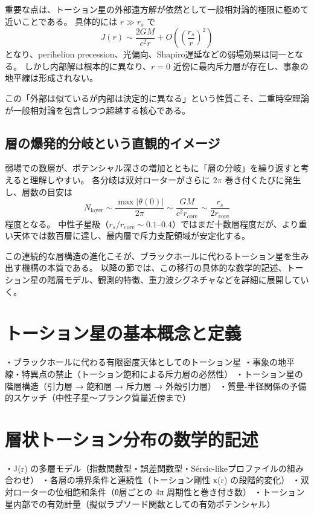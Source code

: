 \documentclass[dvipdfmx,a4paper]{jsbook}
\theoremstyle{definition}
\theoremstyle{remark}
\begin{document}
重要な点は、トーション星の外部遠方解が依然として一般相対論的極限に極めて近いことである。
具体的には $r \gg r_s$ で
\[
J(r) \sim \frac{2GM}{c^2 r} + O\!\left(\left(\frac{r_s}{r}\right)^2\right)
\]
となり、perihelion precession、光偏向、Shapiro遅延などの弱場効果は同一となる。
しかし内部解は根本的に異なり、$r=0$ 近傍に最内斥力層が存在し、事象の地平線は形成されない。

この「外部は似ているが内部は決定的に異なる」という性質こそ、二重時空理論が一般相対論を包含しつつ超越する核心である。

\subsection{層の爆発的分岐という直観的イメージ}

弱場での数層が、ポテンシャル深さの増加とともに「層の分岐」を繰り返すと考えると理解しやすい。
各分岐は双対ローターがさらに $2\pi$ 巻き付くたびに発生し、層数の目安は
\[
N_\text{layer} \sim \frac{\max |\theta(0)|}{2\pi} \sim \frac{GM}{c^2 r_\text{core}} \sim \frac{r_s}{2 r_\text{core}}
\]
程度となる。
中性子星級（$r_s / r_\text{core} \sim 0.1$--$0.4$）ではまだ十数層程度だが、より重い天体では数百層に達し、最内層で斥力支配領域が安定化する。

この連続的な層構造の進化こそが、ブラックホールに代わるトーション星を生み出す機構の本質である。
以降の節では、この移行の具体的な数学的記述、トーション星の階層モデル、観測的特徴、重力波シグネチャなどを詳細に展開していく。

\section{トーション星の基本概念と定義}
    ・ブラックホールに代わる有限密度天体としてのトーション星
    ・事象の地平線・特異点の禁止（トーション飽和による斥力層の必然性）
    ・トーション星の階層構造（引力層 → 飽和層 → 斥力層 → 外殻引力層）
    ・質量-半径関係の予備的スケッチ（中性子星～プランク質量近傍まで）

\section{層状トーション分布の数学的記述}
    ・J(r) の多層モデル（指数関数型・誤差関数型・Sérsic-likeプロファイルの組み合わせ）
    ・各層の境界条件と連続性（トーション剛性 κ(r) の段階的変化）
    ・双対ローターの位相飽和条件（θ層ごとの 4π 周期性と巻き付き数）
    ・トーション星内部での有効計量（擬似ラプソード関数としての有効ポテンシャル）
\end{document}
